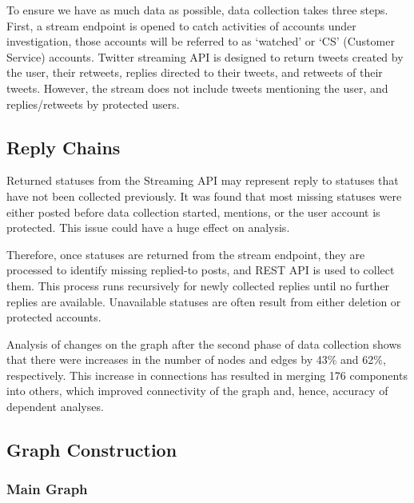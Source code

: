 \documentclass[sigconf]{acmart}
\begin{document}
To ensure we have as much data as possible, data collection takes
three steps. First, a stream endpoint is opened to catch activities of
accounts under investigation, those accounts will be referred to as
`watched' or `CS' (Customer Service) accounts. Twitter streaming API
is designed to return tweets created by the user, their retweets,
replies directed to their tweets, and retweets of their
tweets. However, the stream does not include tweets mentioning the
user, and replies/retweets by protected users. 

\subsection{Reply Chains}

Returned statuses from the Streaming API may represent reply to
statuses that have not been collected previously. It was found that most
missing statuses were either posted before data collection started, mentions, 
or the user account is protected. This issue could have a huge effect on 
analysis. 

Therefore, once statuses are returned from the stream endpoint, they
are processed to identify missing replied-to posts, and REST API is
used to collect them. This process runs recursively for newly
collected replies until no further replies are available. Unavailable
statuses are often result from either deletion or protected accounts.

Analysis of changes on the graph after the second phase of data
collection shows that there were increases in the number of nodes and
edges by 43\% and 62\%, respectively. This increase in connections has
resulted in merging 176 components into others, which improved
connectivity of the graph and, hence, accuracy of dependent analyses.



\subsection{Graph Construction}

\subsubsection{Main Graph}
\end{document}
